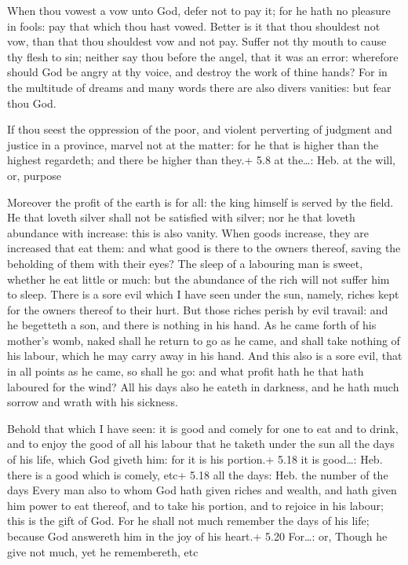  When thou vowest a vow unto God, defer not to pay it; for
he hath no pleasure in fools: pay that which thou hast vowed.
 Better is it that thou shouldest not vow, than that thou
shouldest vow and not pay.  Suffer not thy mouth to cause
thy flesh to sin; neither say thou before the angel, that it was an
error: wherefore should God be angry at thy voice, and destroy the work
of thine hands?  For in the multitude of dreams and many
words there are also divers vanities: but fear thou God.

 If thou seest the oppression of the poor, and violent
perverting of judgment and justice in a province, marvel not at the
matter: for he that is higher than the highest regardeth; and there be
higher than they.+ 5.8 at the\ldots: Heb. at the will, or, purpose

 Moreover the profit of the earth is for all: the king
himself is served by the field.  He that loveth silver
shall not be satisfied with silver; nor he that loveth abundance with
increase: this is also vanity.  When goods increase, they
are increased that eat them: and what good is there to the owners
thereof, saving the beholding of them with their eyes?  The
sleep of a labouring man is sweet, whether he eat little or much: but
the abundance of the rich will not suffer him to sleep. 
There is a sore evil which I have seen under the sun, namely, riches
kept for the owners thereof to their hurt.  But those
riches perish by evil travail: and he begetteth a son, and there is
nothing in his hand.  As he came forth of his mother's
womb, naked shall he return to go as he came, and shall take nothing of
his labour, which he may carry away in his hand.  And this
also is a sore evil, that in all points as he came, so shall he go: and
what profit hath he that hath laboured for the wind?  All
his days also he eateth in darkness, and he hath much sorrow and wrath
with his sickness.

 Behold that which I have seen: it is good and comely for
one to eat and to drink, and to enjoy the good of all his labour that he
taketh under the sun all the days of his life, which God giveth him: for
it is his portion.+ 5.18 it is good\ldots: Heb. there is a good which is
comely, etc+ 5.18 all the days: Heb. the number of the days
 Every man also to whom God hath given riches and wealth,
and hath given him power to eat thereof, and to take his portion, and to
rejoice in his labour; this is the gift of God.  For he
shall not much remember the days of his life; because God answereth him
in the joy of his heart.+ 5.20 For\ldots: or, Though he give not much,
yet he remembereth, etc

